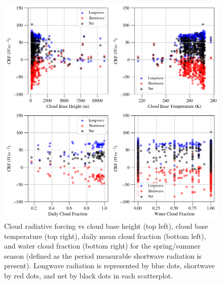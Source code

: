 \begin{figure}[p]
    \centering
    \includegraphics[width=1\linewidth]{figures/chapter4/VSSummer.png}
    \caption[Cloud radiative forcing vs cloud base height, cloud base temperature, cloud fraction, and water cloud fraction for summer.]{Cloud radiative forcing vs cloud base height (top left), cloud base temperature (top right), daily mean cloud fraction (bottom left), and water cloud fraction (bottom right) for the spring/summer season (defined as the period measurable shortwave radiation is present). Longwave radiation is represented by blue dots, shortwave by red dots, and net by black dots in each scatterplot.}
    \label{fig:spring:crf}
\end{figure}

